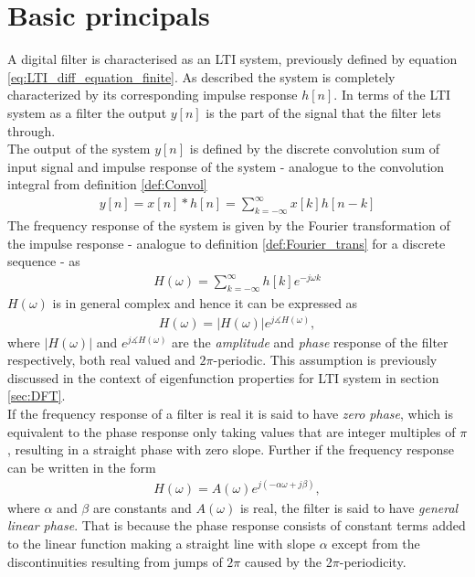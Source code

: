 \section{Basic principals}\label{sec:basic_filter}
A digital filter is characterised as an LTI system, previously defined by equation \eqref{eq:LTI_diff_equation_finite}. As described the system is completely characterized by its corresponding impulse response $h[n]$. In terms of the LTI system as a filter the output $y[n]$ is the part of the signal that the filter lets through. \\
The output of the system $y[n]$ is defined by the discrete convolution sum of input signal and impulse response of the system - analogue to the convolution integral from definition \eqref{def:Convol} 
\begin{align}
y[n] = x[n]*h[n] = \sum_{k=-\infty}^{\infty} x[k]h[n-k]
\end{align}    
The frequency response of the system is given by the Fourier transformation of the impulse response - analogue to definition \ref{def:Fourier_trans} for a discrete sequence - as
\begin{align}\label{eq:freq_res}
H(\omega)=\sum_{k=-\infty}^{\infty}h[k]e^{-j\omega k}
\end{align}
$H(\omega)$ is in general complex and hence it can be expressed as
\begin{align}
H(\omega)=|H(\omega)|e^{j\measuredangle H(\omega)},
\end{align}  
where $|H(\omega)|$ and $e^{j\measuredangle H(\omega)}$ are the \textit{amplitude} and \textit{phase} response of the filter respectively, both real valued and $2\pi$-periodic. This assumption is previously discussed in the context of eigenfunction properties for LTI system in section \ref{sec:DFT}.\\ 
If the frequency response of a filter is real it is said to have \textit{zero phase}, which is equivalent to the phase response only taking values that are integer multiples of $\pi$, resulting in a straight phase with zero slope. Further if the frequency response can be written in the form 
\begin{align}\label{eq:lin_pha}
H(\omega)=A(\omega)e^{j(-\alpha\omega + j\beta)} ,
\end{align}
where $\alpha$ and $\beta$ are constants and $A(\omega)$ is real, the filter is said to have \textit{general linear phase}. That is because the phase response consists of constant terms added to the linear function making a straight line with slope $\alpha$ except from the discontinuities resulting from jumps of $2\pi$ caused by the 2$\pi$-periodicity. \\
